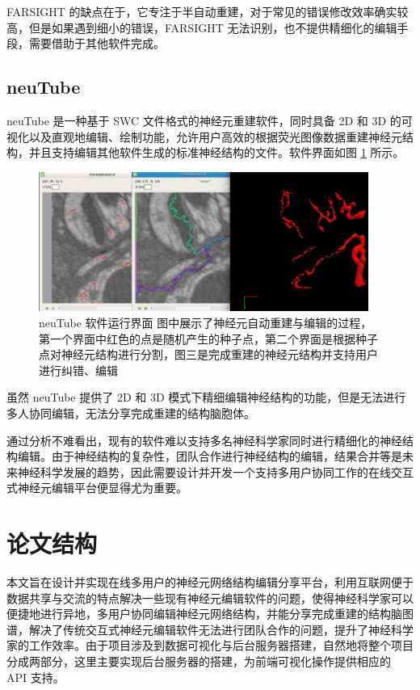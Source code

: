 FARSIGHT 的缺点在于，它专注于半自动重建，对于常见的错误修改效率确实较高，但是如果遇到细小的错误，FARSIGHT 无法识别，也不提供精细化的编辑手段，需要借助于其他软件完成。

\subsection{neuTube}
neuTube 是一种基于 SWC 文件格式的神经元重建软件，同时具备 2D 和 3D 的可视化以及直观地编辑、绘制功能，允许用户高效的根据荧光图像数据重建神经元结构，并且支持编辑其他软件生成的标准神经结构的文件。软件界面如图 \ref{neutube} 所示。

\begin{figure}
\centering
\includegraphics[width=108mm]{images/neutube}
\caption{neuTube 软件运行界面 图中展示了神经元自动重建与编辑的过程，第一个界面中红色的点是随机产生的种子点，第二个界面是根据种子点对神经元结构进行分割，图三是完成重建的神经元结构并支持用户进行纠错、编辑}
\label{neutube}
\end{figure}

虽然 neuTube 提供了 2D 和 3D 模式下精细编辑神经结构的功能，但是无法进行多人协同编辑，无法分享完成重建的结构脑胞体。

通过分析不难看出，现有的软件难以支持多名神经科学家同时进行精细化的神经结构编辑。由于神经结构的复杂性，团队合作进行神经结构的编辑，结果合并等是未来神经科学发展的趋势，因此需要设计并开发一个支持多用户协同工作的在线交互式神经元编辑平台便显得尤为重要。

\section{论文结构}
本文旨在设计并实现在线多用户的神经元网络结构编辑分享平台，利用互联网便于数据共享与交流的特点解决一些现有神经元编辑软件的问题，使得神经科学家可以便捷地进行异地，多用户协同编辑神经元网络结构，并能分享完成重建的结构脑图谱，解决了传统交互式神经元编辑软件无法进行团队合作的问题，提升了神经科学家的工作效率。由于项目涉及到数据可视化与后台服务器搭建，自然地将整个项目分成两部分，这里主要实现后台服务器的搭建，为前端可视化操作提供相应的 API 支持。

